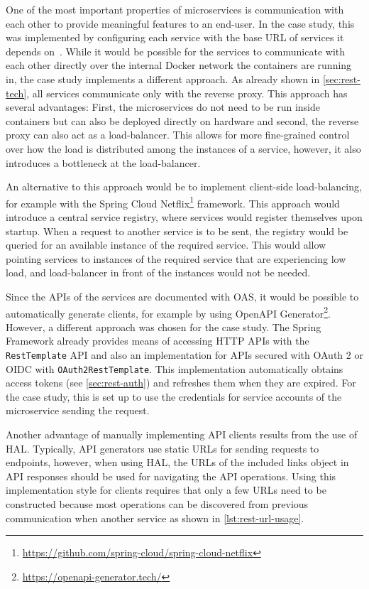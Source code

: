 One of the most important properties of microservices is communication with each other to provide meaningful features to an end-user.
In the case study, this was implemented by configuring each service with the base \ac{URL} of services it depends on~\cite{Taibi2020}.
While it would be possible for the services to communicate with each other directly over the internal Docker network the containers are running in, the case study implements a different approach.
As already shown in \autoref{sec:rest-tech}, all services communicate only with the reverse proxy.
This approach has several advantages:
First, the microservices do not need to be run inside containers but can also be deployed directly on hardware and second, the reverse proxy can also act as a load-balancer.
This allows for more fine-grained control over how the load is distributed among the instances of a service, however, it also introduces a bottleneck at the load-balancer.

An alternative to this approach would be to implement client-side load-balancing, for example with the Spring Cloud Netflix\footnote{\url{https://github.com/spring-cloud/spring-cloud-netflix}} framework.
This approach would introduce a central service registry, where services would register themselves upon startup.
When a request to another service is to be sent, the registry would be queried for an available instance of the required service.
This would allow pointing services to instances of the required service that are experiencing low load, and load-balancer in front of the instances would not be needed.

Since the \acp{API} of the services are documented with \ac{OAS}, it would be possible to automatically generate clients, for example by using Open\acs{API} Generator\footnote{\url{https://openapi-generator.tech/}}.
However, a different approach was chosen for the case study.
The Spring Framework already provides means of accessing \ac{HTTP} \acp{API} with the \texttt{RestTemplate} \ac{API} and also an implementation for \acp{API} secured with OAuth 2 or \ac{OIDC} with \texttt{OAuth2RestTemplate}.
This implementation automatically obtains access tokens (see \autoref{sec:rest-auth}) and refreshes them when they are expired.
For the case study, this is set up to use the credentials for service accounts of the microservice sending the request.

Another advantage of manually implementing \ac{API} clients results from the use of \ac{HAL}.
Typically, \ac{API} generators use static \acp{URL} for sending requests to endpoints, however, when using \ac{HAL}, the \acp{URL} of the included links object in \ac{API} responses should be used for navigating the \ac{API} operations.
Using this implementation style for clients requires that only a few \acp{URL} need to be constructed because most operations can be discovered from previous communication when another service as shown in \autoref{lst:rest-url-usage}.

